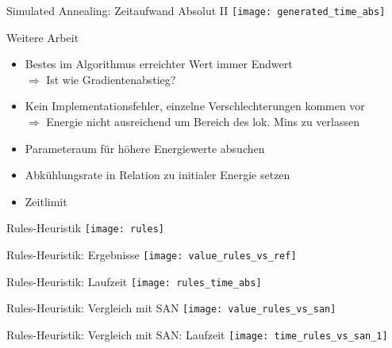 \documentclass[ngerman,aspectratio=169,10pt]{beamer}
\begin{document}
\begin{frame}{Simulated Annealing: Zeitaufwand Absolut II}
    \centering
    \texttt{[image: generated\_time\_abs]}
\end{frame}

\begin{frame}{Weitere Arbeit}
    \begin{itemize}
        \item Bestes im Algorithmus erreichter Wert immer Endwert\\
        $\Longrightarrow$ Ist wie Gradientenabstieg?
        \item Kein Implementationsfehler, einzelne Verschlechterungen kommen vor\\
        $\Longrightarrow$ Energie nicht ausreichend um Bereich des lok. Mins zu verlassen
        \item Parameteraum für höhere Energiewerte absuchen
        \item Abkühlungsrate in Relation zu initialer Energie setzen
        \item Zeitlimit
    \end{itemize}
\end{frame}

\begin{frame}{Rules-Heuristik}
    \centering
    \texttt{[image: rules]}
\end{frame}

\begin{frame}{Rules-Heuristik: Ergebnisse}
    \centering
    \texttt{[image: value\_rules\_vs\_ref]}
\end{frame}

\begin{frame}{Rules-Heuristik: Laufzeit}
    \centering
    \texttt{[image: rules\_time\_abs]}
\end{frame}

\begin{frame}{Rules-Heuristik: Vergleich mit SAN}
    \centering
    \texttt{[image: value\_rules\_vs\_san]}
\end{frame}

\begin{frame}{Rules-Heuristik: Vergleich mit SAN: Laufzeit}
    \centering
    \texttt{[image: time\_rules\_vs\_san\_1]}
\end{frame}
\end{document}
